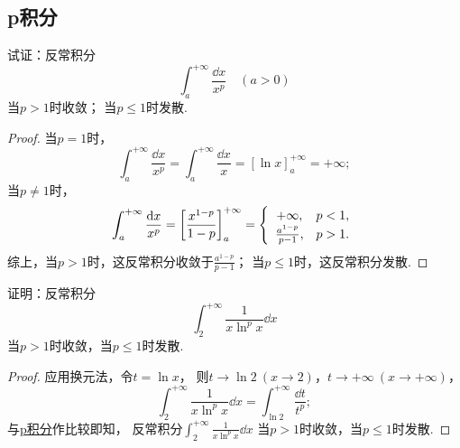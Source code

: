 \subsection{p积分}
\begin{example}[p积分]\label{example:定积分.p积分}
试证：反常积分\[
\int_a^{+\infty} \frac{\dd{x}}{x^p} \quad(a>0)
\]
当\(p > 1\)时收敛；
当\(p \leqslant 1\)时发散.
\begin{proof}
当\(p=1\)时，\[
\int_a^{+\infty} \frac{\dd{x}}{x^p}
= \int_a^{+\infty} \frac{\dd{x}}{x}
= [\ln x]_a^{+\infty} = +\infty;
\]当\(p\neq1\)时，\[
\int_a^{+\infty} \frac{\dd{x}}{x^p}
= \left[ \frac{x^{1-p}}{1-p} \right]_a^{+\infty}
= \left\{ \def\arraystretch{1.2} \begin{array}{cl}
+\infty, & p<1, \\
\frac{a^{1-p}}{p-1}, & p>1.
\end{array} \right.
\]
综上，当\(p > 1\)时，这反常积分收敛于\(\frac{a^{1-p}}{p-1}\)；
当\(p\leqslant1\)时，这反常积分发散.
\end{proof}
\end{example}

\begin{example}
证明：反常积分\[
\int_2^{+\infty} \frac{1}{x \ln^p x} \dd{x}
\]
当\(p>1\)时收敛，当\(p\leqslant1\)时发散.
\begin{proof}
应用换元法，令\(t = \ln x\)，%
则\(t \to \ln2\ (x\to2)\)，\(t \to +\infty\ (x\to+\infty)\)，%
\[
\int_2^{+\infty} \frac{1}{x \ln^p x} \dd{x}
= \int_{\ln2}^{+\infty} \frac{\dd{t}}{t^p};
\]
与\hyperref[example:定积分.p积分]{p积分}作比较即知，
反常积分\(\int_2^{+\infty} \frac{1}{x \ln^p x} \dd{x}\)%
当\(p>1\)时收敛，当\(p\leqslant1\)时发散.
\end{proof}
\end{example}

